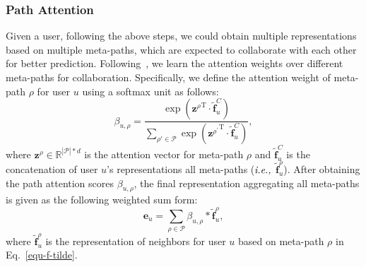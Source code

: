 \subsubsection{Path Attention}
Given a user, following the above steps, we could obtain multiple representations based on multiple meta-paths, which are expected to collaborate with each other for better prediction. Following~\citep{qu2017attention}, we learn  the attention weights over different meta-paths for collaboration. Specifically, we define the attention weight of meta-path $\rho$ for user $u$ using a softmax unit as follows:
\begin{equation}
\beta_{u, \rho} = \frac{\exp({\mathbf{z}^{\rho}}^{\mathrm{T}} \cdot \mathbf{\widetilde{f}}^C_u)}{\sum_{\rho' \in \mathcal{P}}{\exp({\mathbf{z}^{\rho^\prime}}^{\mathrm{T}} \cdot \mathbf{\widetilde{f}}^C_u)}},
\end{equation}
where $\mathbf{z}^{\rho} \in \mathbb{R}^{|\mathcal{P}| * d}$ is the attention vector for meta-path $\rho$ and $\widetilde{\mathbf{f}}^C_u$ is the concatenation of user $u$'s representations \wrt all meta-paths ($\emph{i.e.,}$ $\widetilde{\mathbf{f}}^{\rho}_u$). After obtaining the path attention scores $\beta_{u, \rho}$, the final representation aggregating all meta-paths is given as the following weighted sum form:
\begin{equation}
\mathbf{e}_u = \sum_{\rho \in \mathcal{P}}{\beta_{u, \rho} * \mathbf{\widetilde{f}}^{\rho}_u},
\end{equation}
where $\mathbf{\widetilde{f}}^{\rho}_u$ is the representation of neighbors for user $u$ based on meta-path $\rho$ in Eq.~\ref{equ-f-tilde}.

